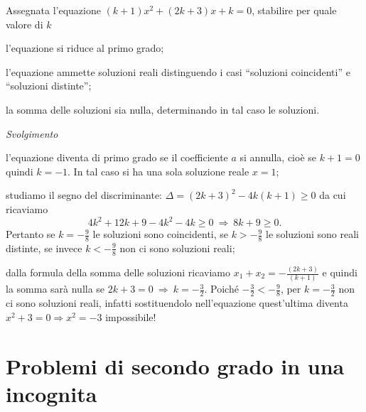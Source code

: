 \begin{exrig}
\begin{esempio}
Assegnata l'equazione $( k + 1 ) x^{2} + ( 2 k + 3 ) x + k = 0$, stabilire per quale valore di $k$
\begin{enumeratea}
\item l'equazione si riduce al primo grado;
\item l'equazione ammette soluzioni reali distinguendo i casi ``soluzioni coincidenti'' e ``soluzioni distinte'';
\item la somma delle soluzioni sia nulla, determinando in tal caso le soluzioni.
\end{enumeratea}
\emph{Svolgimento}
\begin{enumeratea}
\item l'equazione diventa di primo grado se il coefficiente $a$ si annulla, cioè se $k + 1 = 0$ quindi $k = - 1$. In tal caso si ha una sola soluzione reale $ x=1 $;
\item studiamo il segno del discriminante: $\Delta = ( 2 k + 3 )^{2} - 4 k ( k + 1 ) \geq 0$ da cui ricaviamo 
\[4 k^{2} + 12 k + 9 - 4 k^{2} - 4 k \geq 0 \:\Rightarrow\: 8 k + 9 \geq 0.\] 
Pertanto se $k = - \frac{9}{8}$ le soluzioni sono coincidenti, se $k > - \frac{9}{8}$ le soluzioni sono reali distinte, se invece $ k<-\frac{9}{8} $ non ci sono soluzioni reali;
\item dalla formula della somma delle soluzioni ricaviamo $x_{1} + x_{2} = - \frac{( 2 k + 3 )}{( k + 1 )}$ e quindi la somma sarà nulla se $2 k + 3 = 0 \:\Rightarrow\: k = - \frac{3}{2}$. Poiché $- \frac{3}{2} < - \frac{9}{8}$, per $k = - \frac{3}{2}$ non ci sono soluzioni reali, infatti sostituendolo nell'equazione quest'ultima diventa $ x^2+3=0 \Rightarrow x^2=-3$ impossibile!
\end{enumeratea}
\end{esempio}
\end{exrig}
\vspazio\ovalbox{\risolvii \ref{ese:3.91}, \ref{ese:3.92}, \ref{ese:3.93}, \ref{ese:3.94}, \ref{ese:3.95}, \ref{ese:3.96}, \ref{ese:3.97}, \ref{ese:3.98}, \ref{ese:3.99}, \ref{ese:3.100}, \ref{ese:3.101}, \ref{ese:3.102},}

\vspazio\ovalbox{\ref{ese:3.103}, \ref{ese:3.104}, \ref{ese:3.105}, \ref{ese:3.106}, \ref{ese:3.107}, \ref{ese:3.108}, \ref{ese:3.109}, \ref{ese:3.110}, \ref{ese:3.111}}

\section{Problemi di secondo grado in una incognita}

